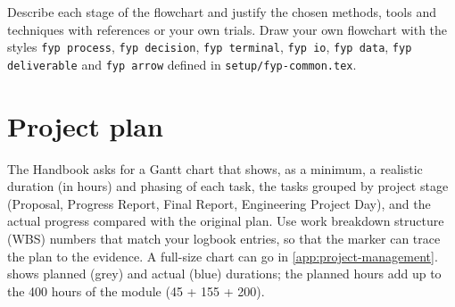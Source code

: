 \begin{guidance}
Describe each stage of the flowchart and justify the chosen methods, tools
and techniques with references or your own trials. Draw your own flowchart
with the styles \texttt{fyp process}, \texttt{fyp decision},
\texttt{fyp terminal}, \texttt{fyp io}, \texttt{fyp data},
\texttt{fyp deliverable} and \texttt{fyp arrow} defined in
\texttt{setup/fyp-common.tex}.
\end{guidance}

\section{Project plan}
\label{sec:plan}

\begin{guidance}
The Handbook asks for a Gantt chart that shows, as a minimum, a realistic
duration (in hours) and phasing of each task, the tasks grouped by project
stage (Proposal, Progress Report, Final Report, Engineering Project Day), and
the actual progress compared with the original plan. Use work breakdown
structure (WBS) numbers that match your logbook entries, so that the marker
can trace the plan to the evidence. A full-size chart can go in
\cref{app:project-management}.  shows planned
(grey) and actual (blue) durations; the planned hours add up to the 400
hours of the module (45 + 155 + 200).
\end{guidance}

